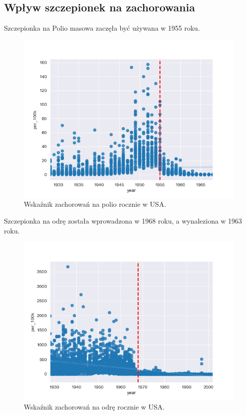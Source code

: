 \documentclass{classrep}
\begin{document}
\subsection{Wpływ szczepionek na zachorowania}
    Szczepionka na Polio masowa zaczęła być używana w 1955 roku.
    \begin{figure}[H]
        \centering
        \includegraphics[width=1\textwidth]{images/images1/Figure_4.png}
        \caption{Wskaźnik zachorowań na polio rocznie w USA.}
        \label{fig4}
    \end{figure}

    Szczepionka na odrę została wprowadzona w 1968 roku, a wynaleziona w 1963 roku.
    \begin{figure}[H]
        \centering
        \includegraphics[width=1\textwidth]{images/images1/Figure_5.png}
        \caption{Wskaźnik zachorowań na odrę rocznie w USA.}
        \label{fig5}
    \end{figure}
\end{document}
